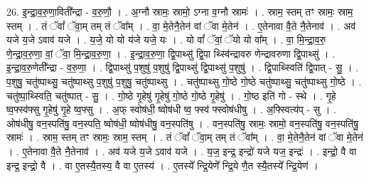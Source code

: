 \documentclass[17pt]{extarticle}
\begin{document}
26. इ॒न्द्रा॒व॒रु॒णा॒विती᳚न्द्रा - व॒रु॒णौ॒ । . अ॒ग्नौ स्रामः॒ स्रामो॒ ऽग्ना व॒ग्नौ स्रामः॑ । . स्राम॒ स्तम् तꣳ स्रामः॒ स्राम॒ स्तम् । . तं ॅवां᳚ ॅवा॒म् तम् तं ॅवा᳚म् । . वा॒ मे॒तेनै॒तेन॑ वां ॅवा मे॒तेन॑ । . ए॒तेनावा वै॒ते नै॒तेनाव॑ । . अव॑ यजे य॒जे ऽवाव॑ यजे । . य॒जे॒ यो यो य॑जे यजे॒ यः । . यो वां᳚ ॅवां॒ ॅयो यो वा᳚म् । . वा॒ मि॒न्द्रा॒व॒रु॒ णे॒न्द्रा॒व॒रु॒णा॒ वां॒ ॅवा॒ मि॒न्द्रा॒व॒रु॒णा॒ । . इ॒न्द्रा॒व॒रु॒णा॒ द्वि॒पाथ्सु॑ द्वि॒पा थ्स्वि॑न्द्रावरु णेन्द्रावरुणा द्वि॒पाथ्सु॑ । . इ॒न्द्रा॒व॒रु॒णेती᳚न्द्रा - व॒रु॒णा॒ । . द्वि॒पाथ्सु॑ प॒शुषु॑ प॒शुषु॑ द्वि॒पाथ्सु॑ द्वि॒पाथ्सु॑ प॒शुषु॑ । . द्वि॒पाथ्स्विति॑ द्वि॒पात् - सु॒ । . प॒शुषु॒ चतु॑ष्पाथ्सु॒ चतु॑ष्पाथ्सु प॒शुषु॑ प॒शुषु॒ चतु॑ष्पाथ्सु । . चतु॑ष्पाथ्सु गो॒ष्ठे गो॒ष्ठे चतु॑ष्पाथ्सु॒ चतु॑ष्पाथ्सु गो॒ष्ठे । . चतु॑ष्पा॒थ्स्विति॒ चतु॑ष्पात् - सु॒ । . गो॒ष्ठे गृ॒हेषु॑ गृ॒हेषु॑ गो॒ष्ठे गो॒ष्ठे गृ॒हेषु॑ । . गो॒ष्ठ इति॑ गो - स्थे । . गृ॒हे ष्व॒फ्स्व॑फ्सु गृ॒हेषु॑ गृ॒हे ष्व॒फ्सु । . अ॒फ् स्वोष॑धी॒ ष्वोष॑धी ष्व॒ फ्स्व॑ फ्स्वोष॑धीषु । . अ॒फ्स्वित्य॑प् - सु । . ओष॑धीषु॒ वन॒स्पति॑षु॒ वन॒स्पति॒ ष्वोष॑धी॒ ष्वोष॑धीषु॒ वन॒स्पति॑षु । . वन॒स्पति॑षु॒ स्रामः॒ स्रामो॒ वन॒स्पति॑षु॒ वन॒स्पति॑षु॒ स्रामः॑ । . स्राम॒ स्तम् तꣳ स्रामः॒ स्राम॒ स्तम् । . तं ॅवां᳚ ॅवा॒म् तम् तं ॅवा᳚म् । . वा॒ मे॒तेनै॒तेन॑ वां ॅवा मे॒तेन॑ । . ए॒तेनावा वै॒ते नै॒तेनाव॑ । . अव॑ यजे य॒जे ऽवाव॑ यजे । . य॒ज॒ इन्द्र॒ इन्द्रो॑ यजे यज॒ इन्द्रः॑ । . इन्द्रो॒ वै वा इन्द्र॒ इन्द्रो॒ वै । . वा ए॒तस्यै॒तस्य॒ वै वा ए॒तस्य॑ । . ए॒तस्ये᳚ न्द्रि॒येणे᳚ न्द्रि॒ये णै॒त स्यै॒तस्ये᳚ न्द्रि॒येण॑ । \newline
\end{document}
